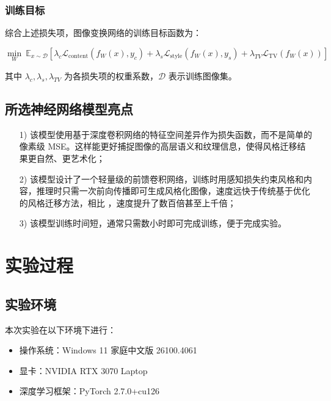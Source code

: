 \documentclass{article}
\begin{document}
\subsubsection{训练目标}

综合上述损失项，图像变换网络的训练目标函数为：

\begin{equation}
\min_W \ \mathbb{E}_{x \sim \mathcal{D}} \left[ \lambda_c \mathcal{L}_{\text{content}}(f_W(x), y_c) + \lambda_s \mathcal{L}_{\text{style}}(f_W(x), y_s) + \lambda_{TV} \mathcal{L}_{\text{TV}}(f_W(x)) \right]
\end{equation}

其中 $\lambda_c, \lambda_s, \lambda_{TV}$ 为各损失项的权重系数，$\mathcal{D}$ 表示训练图像集。


\newpage
\subsection{所选神经网络模型亮点}

\begin{enumerate}[noitemsep]
    \item[1)] 该模型使用基于深度卷积网络的特征空间差异作为损失函数，而不是简单的像素级 MSE。这样能更好捕捉图像的高层语义和纹理信息，使得风格迁移结果更自然、更艺术化；
    \item[2)] 该模型设计了一个轻量级的前馈卷积网络，训练时用感知损失约束风格和内容，推理时只需一次前向传播即可生成风格化图像，速度远快于传统基于优化的风格迁移方法，相比 \cite{gatys2015neural}，速度提升了数百倍甚至上千倍；
    \item[3)] 该模型训练时间短，通常只需数小时即可完成训练，便于完成实验。 
\end{enumerate}

\section{实验过程}

\subsection{实验环境}

本次实验在以下环境下进行：

\begin{itemize}[noitemsep]
    \item 操作系统：Windows 11 家庭中文版 26100.4061
    \item 显卡：NVIDIA RTX 3070 Laptop
    \item 深度学习框架：PyTorch 2.7.0+cu126
\end{itemize}
\end{document}
